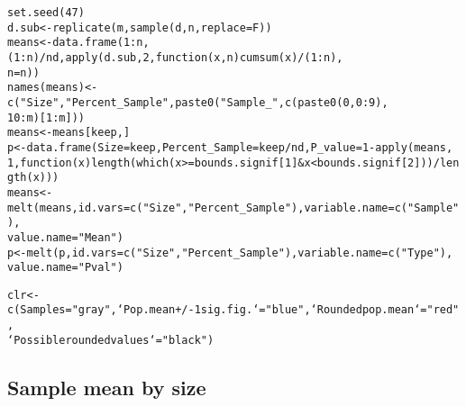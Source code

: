 \documentclass{article}\usepackage[]{graphicx}\usepackage[]{color}
\makeatletter
\newcommand{\hlnum}[1]{\textcolor[rgb]{0.863,0.196,0.184}{#1}}%
\newcommand{\hlstr}[1]{\textcolor[rgb]{0.863,0.196,0.184}{#1}}%
\newcommand{\hlopt}[1]{\textcolor[rgb]{0.576,0.631,0.631}{#1}}%
\newcommand{\hlstd}[1]{\textcolor[rgb]{0.514,0.58,0.588}{#1}}%
\newcommand{\hlkwa}[1]{\textcolor[rgb]{0.796,0.294,0.086}{#1}}%
\newcommand{\hlkwb}[1]{\textcolor[rgb]{0.522,0.6,0}{#1}}%
\newcommand{\hlkwc}[1]{\textcolor[rgb]{0.796,0.294,0.086}{#1}}%
\newcommand{\hlkwd}[1]{\textcolor[rgb]{0.576,0.631,0.631}{#1}}%
\newenvironment{kframe}{%
 \def\at@end@of@kframe{}%
 \ifinner\ifhmode%
  \def\at@end@of@kframe{\end{minipage}}%
  \begin{minipage}{\columnwidth}%
 \fi\fi%
 \def\FrameCommand##1{\hskip\@totalleftmargin \hskip-\fboxsep
 \colorbox{shadecolor}{##1}\hskip-\fboxsep
     \hskip-\linewidth \hskip-\@totalleftmargin \hskip\columnwidth}%
 \MakeFramed {\advance\hsize-\width
   \@totalleftmargin\z@ \linewidth\hsize
   \@setminipage}}%
 {\par\unskip\endMakeFramed%
 \at@end@of@kframe}
\newenvironment{knitrout}{}{} %
\makeatother
\begin{document}
\begin{knitrout}
\begin{kframe}
\begin{alltt}
\hlkwd{set.seed}\hlstd{(}\hlnum{47}\hlstd{)}
\hlstd{d.sub} \hlkwb{<-} \hlkwd{replicate}\hlstd{(m,} \hlkwd{sample}\hlstd{(d, n,} \hlkwc{replace} \hlstd{= F))}
\hlstd{means} \hlkwb{<-} \hlkwd{data.frame}\hlstd{(}\hlnum{1}\hlopt{:}\hlstd{n, (}\hlnum{1}\hlopt{:}\hlstd{n)}\hlopt{/}\hlstd{nd,} \hlkwd{apply}\hlstd{(d.sub,} \hlnum{2}\hlstd{,} \hlkwa{function}\hlstd{(}\hlkwc{x}\hlstd{,} \hlkwc{n}\hlstd{)} \hlkwd{cumsum}\hlstd{(x)}\hlopt{/}\hlstd{(}\hlnum{1}\hlopt{:}\hlstd{n),}
    \hlkwc{n} \hlstd{= n))}
\hlkwd{names}\hlstd{(means)} \hlkwb{<-} \hlkwd{c}\hlstd{(}\hlstr{"Size"}\hlstd{,} \hlstr{"Percent_Sample"}\hlstd{,} \hlkwd{paste0}\hlstd{(}\hlstr{"Sample_"}\hlstd{,} \hlkwd{c}\hlstd{(}\hlkwd{paste0}\hlstd{(}\hlnum{0}\hlstd{,} \hlnum{0}\hlopt{:}\hlnum{9}\hlstd{),}
    \hlnum{10}\hlopt{:}\hlstd{m)[}\hlnum{1}\hlopt{:}\hlstd{m]))}
\hlstd{means} \hlkwb{<-} \hlstd{means[keep, ]}
\hlstd{p} \hlkwb{<-} \hlkwd{data.frame}\hlstd{(}\hlkwc{Size} \hlstd{= keep,} \hlkwc{Percent_Sample} \hlstd{= keep}\hlopt{/}\hlstd{nd,} \hlkwc{P_value} \hlstd{=} \hlnum{1} \hlopt{-} \hlkwd{apply}\hlstd{(means,}
    \hlnum{1}\hlstd{,} \hlkwa{function}\hlstd{(}\hlkwc{x}\hlstd{)} \hlkwd{length}\hlstd{(}\hlkwd{which}\hlstd{(x} \hlopt{>=} \hlstd{bounds.signif[}\hlnum{1}\hlstd{]} \hlopt{&} \hlstd{x} \hlopt{<} \hlstd{bounds.signif[}\hlnum{2}\hlstd{]))}\hlopt{/}\hlkwd{length}\hlstd{(x)))}
\hlstd{means} \hlkwb{<-} \hlkwd{melt}\hlstd{(means,} \hlkwc{id.vars} \hlstd{=} \hlkwd{c}\hlstd{(}\hlstr{"Size"}\hlstd{,} \hlstr{"Percent_Sample"}\hlstd{),} \hlkwc{variable.name} \hlstd{=} \hlkwd{c}\hlstd{(}\hlstr{"Sample"}\hlstd{),}
    \hlkwc{value.name} \hlstd{=} \hlstr{"Mean"}\hlstd{)}
\hlstd{p} \hlkwb{<-} \hlkwd{melt}\hlstd{(p,} \hlkwc{id.vars} \hlstd{=} \hlkwd{c}\hlstd{(}\hlstr{"Size"}\hlstd{,} \hlstr{"Percent_Sample"}\hlstd{),} \hlkwc{variable.name} \hlstd{=} \hlkwd{c}\hlstd{(}\hlstr{"Type"}\hlstd{),}
    \hlkwc{value.name} \hlstd{=} \hlstr{"Pval"}\hlstd{)}

\hlstd{clr} \hlkwb{<-} \hlkwd{c}\hlstd{(}\hlkwc{Samples} \hlstd{=} \hlstr{"gray"}\hlstd{,} \hlkwc{`Pop. mean +/- 1 sig. fig.`} \hlstd{=} \hlstr{"blue"}\hlstd{,} \hlkwc{`Rounded pop. mean`} \hlstd{=} \hlstr{"red"}\hlstd{,}
    \hlkwc{`Possible rounded values`} \hlstd{=} \hlstr{"black"}\hlstd{)}
\end{alltt}
\end{kframe}
\end{knitrout}

\subsection{Sample mean by size}
\end{document}

